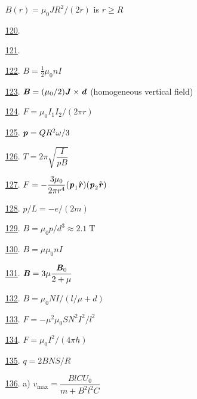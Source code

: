 \begin{multicols}{2}
\begin{enumerate}
	$B(r)=\mu_0JR^2/(2r)$ is $r\geq R$ %
	\item [\hyperlink{P120}{120}.]  %
	\item [\hyperlink{P121}{121}.]  %
	\item [\hyperlink{P122}{122}.] $B=\frac{1}{2}\mu_0nI$ %
	\item [\hyperlink{P123}{123}.] $\textbf{\textit{B}}=(\mu_0/2)\textbf{\textit{J}}\times\textbf{\textit{d}}$ (homogeneous vertical field) %
	\item [\hyperlink{P124}{124}.] $F=\mu_0I_1I_2/(2\pi r)$ %
    \item [\hyperlink{P125}{125}.] $\textbf{\textit{p}}=QR^2\omega/3$ %
	\item [\hyperlink{P126}{126}.] $T=2\pi\sqrt{\dfrac{I}{pB}}$ %
	\item [\hyperlink{P127}{127}.] $F=-\dfrac{3\mu_0}{2\pi r^4}(\textbf{\textit{p}}_1\hat{\textbf{\textit{r}}})(\textbf{\textit{p}}_2\hat{\textbf{\textit{r}}})$ %
	\item [\hyperlink{P128}{128}.] $p/L=-e/(2m)$ %
	\item [\hyperlink{P129}{129}.] $B=\mu_0p/d^3\approx2.1\;\text{T}$ %
	\item [\hyperlink{P130}{130}.] $B=\mu\mu_0nI$ %
	\item [\hyperlink{P131}{131}.] $\textbf{\textit{B}}=3\mu\dfrac{\textbf{\textit{B}}_0}{2+\mu}$ %
	\item [\hyperlink{P132}{132}.] $B=\mu_0NI/(l/\mu+d)$ %
	\item [\hyperlink{P133}{133}.] $F=-\mu^2\mu_0SN^2I^2/l^2$ %
	\item [\hyperlink{P134}{134}.] $F=\mu_0I^2/(4\pi h)$ %
	\item [\hyperlink{P135}{135}.] $q=2BNS/R$ %
	\item [\hyperlink{P136}{136}.] a) $v_\text{max}=\dfrac{BlCU_0}{m+B^2l^2C}$
	

\end{enumerate}
\end{multicols}
